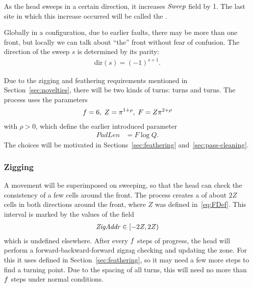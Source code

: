 \documentclass[11pt]{memoir}
\theoremstyle{definition} %
\renewcommand{\le}{\leq}
\newcommand{\fld}[1]{\ensuremath{\textit{#1\/}}}
\newcommand{\F}{F}
\newcommand{\passno}{\pi}
\newcommand{\Q}{Q} %
\newcommand{\Z}{Z} %
\newcommand{\dir}{\mathrm{dir}} %
\newcommand{\PadLen}{\mathit{PadLen}} %
\newcommand{\Sweep}{\fld{Sweep}} %
\newcommand{\ZigAddr}{\fld{ZigAddr}}
\begin{document}
\begin{definition}[Front]\label{def:front}
As the head sweeps in a certain direction, it increases \( \Sweep \) field by 1.
  The last site in which this increase occurred will be called the . 
\end{definition}

Globally in a configuration, due to earlier faults, there may be more than one front, but locally
we can talk about ``the'' front without fear of confusion.
The direction of the sweep \( s \) is determined by its parity:
\begin{align*}
  \dir(s)=(-1)^{s + 1}.
 \end{align*}

 Due to the zigging and feathering requirements mentioned in Section~\ref{sec:novelties},
 there will be two kinds of turns:  turns and  turns.
 The process uses the parameters
\begin{align}\label{eq:FDef}
   \f = 6,\; \Z = \passno^{1+\rho},\; \F = \Z\passno^{2+\rho}
\end{align}
with \( \rho>0 \), which  define the earlier introduced parameter
\begin{align}\label{eq:PadLenDef}
  \PadLen &= \F\log\Q.   
 \end{align}
The choices will be motivated in Sections~\ref{sec:feathering} and~\ref{sec:pass-cleaning}.

\subsubsection{Zigging}\label{sec:zigging}

A  movement will be superimposed on sweeping,
so that the head can check the consistency of a few cells around the front.
The process creates a  of about \( 2\Z \) cells in both directions around the front,
where \( \Z \) was defined in~\eqref{eq:FDef}.
This interval is marked by the values of the field
\begin{align*}
  \ZigAddr\in\lint{-2\Z}{2\Z}
\end{align*}
which is undefined elsewhere.
After every \( f \) steps of progress, the head will perform a forward-backward-forward
zigzag checking and updating the zone.
For this it uses  defined in Section~\ref{sec:feathering},
so it may need a few more steps to find a turning point.
Due to the spacing of all turns, this will need
no more than \( f \) steps under normal conditions. %
\end{document}

